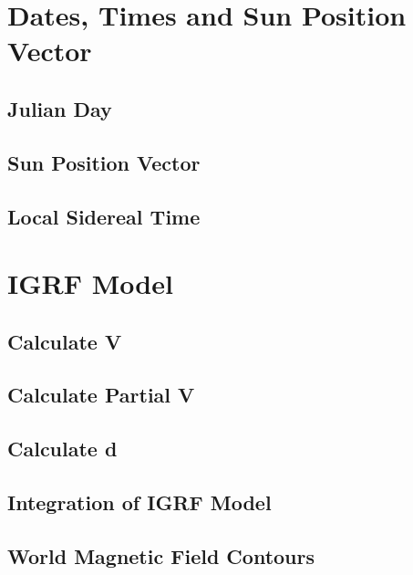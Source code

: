 \section{Dates, Times and Sun Position Vector}\label{app:Dates_and_Times}
\subsection{Julian Day}\label{app:jd}
\footnotesize{}
\subsection{Sun Position Vector}\label{app:sp}
\footnotesize{}
\footnotesize{}
\subsection{Local Sidereal Time}\label{app:sd}
\footnotesize{}

\clearpage

\section{IGRF Model}\label{app:matlab_IGRF}
\subsection{Calculate V}
\footnotesize{}
\subsection{Calculate Partial V}
\footnotesize{}
\subsection{Calculate d}
\footnotesize{}
\subsection{Integration of IGRF Model}
\footnotesize{}
\subsection{World Magnetic Field Contours}
\footnotesize{}


